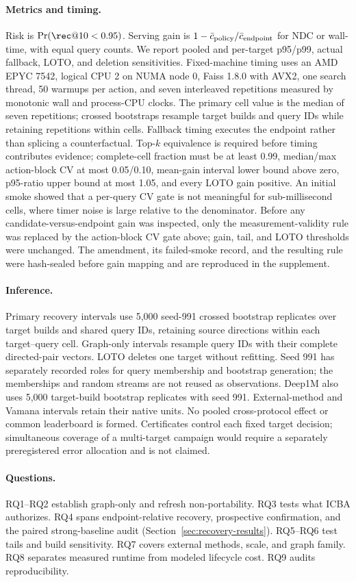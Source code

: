 \paragraph{Metrics and timing.}
Risk is $\Pr(\rec@10<0.95)$. Serving gain is $1-\bar c_{\rm policy}/\bar c_{\rm endpoint}$ for NDC or wall-time, with equal query counts. We report pooled and per-target p95/p99, actual fallback, LOTO, and deletion sensitivities. Fixed-machine timing uses an AMD EPYC 7542, logical CPU 2 on NUMA node 0, Faiss 1.8.0 with AVX2, one search thread, 50 warmups per action, and seven interleaved repetitions measured by monotonic wall and process-CPU clocks. The primary cell value is the median of seven repetitions; crossed bootstraps resample target builds and query IDs while retaining repetitions within cells. Fallback timing executes the endpoint rather than splicing a counterfactual. Top-$k$ equivalence is required before timing contributes evidence; complete-cell fraction must be at least 0.99, median/max action-block CV at most 0.05/0.10, mean-gain interval lower bound above zero, p95-ratio upper bound at most 1.05, and every LOTO gain positive. An initial smoke showed that a per-query CV gate is not meaningful for sub-millisecond cells, where timer noise is large relative to the denominator. Before any candidate-versus-endpoint gain was inspected, only the measurement-validity rule was replaced by the action-block CV gate above; gain, tail, and LOTO thresholds were unchanged. The amendment, its failed-smoke record, and the resulting rule were hash-sealed before gain mapping and are reproduced in the supplement.

\paragraph{Inference.}
Primary recovery intervals use 5,000 seed-991 crossed bootstrap replicates over target builds and shared query IDs, retaining source directions within each target--query cell. Graph-only intervals resample query IDs with their complete directed-pair vectors. LOTO deletes one target without refitting. Seed 991 has separately recorded roles for query membership and bootstrap generation; the memberships and random streams are not reused as observations. Deep1M also uses 5,000 target-build bootstrap replicates with seed 991. External-method and Vamana intervals retain their native units. No pooled cross-protocol effect or common leaderboard is formed. Certificates control each fixed target decision; simultaneous coverage of a multi-target campaign would require a separately preregistered error allocation and is not claimed.

\paragraph{Questions.}
RQ1--RQ2 establish graph-only and refresh non-portability. RQ3 tests what ICBA authorizes. RQ4 spans endpoint-relative recovery, prospective confirmation, and the paired strong-baseline audit (Section~\ref{sec:recovery-results}). RQ5--RQ6 test tails and build sensitivity. RQ7 covers external methods, scale, and graph family. RQ8 separates measured runtime from modeled lifecycle cost. RQ9 audits reproducibility.
